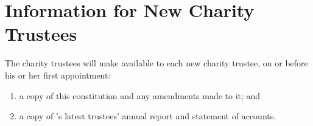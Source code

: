 \section{Information for New Charity Trustees}\label{sec:new_trustees}
The charity trustees will make available to each new charity trustee, on or before his or her first appointment:
\begin{enumerate}
    \item a copy of this constitution and any amendments made to it; and
    \item a copy of \shortname{}'s latest trustees’ annual report and statement of accounts.
\end{enumerate}

